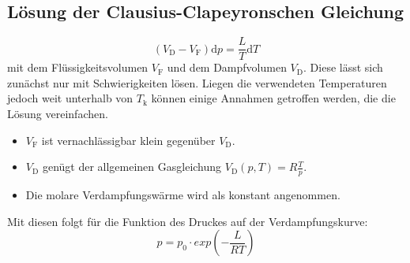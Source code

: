          \subsection{Lösung der Clausius-Clapeyronschen Gleichung}
         \begin{equation}
           (V_\text{D}-V_\text{F})\text{d}p = \frac{L}{T}\text{d}T \label{eq:DGL}
           \end{equation}
           mit dem Flüssigkeitsvolumen $V_\text{F}$ und dem Dampfvolumen $V_\text{D}$.
Diese lässt sich zunächst nur mit Schwierigkeiten lösen.
Liegen die verwendeten Temperaturen jedoch weit unterhalb von $T_\text{k}$ können
 einige Annahmen getroffen werden, die die Lösung vereinfachen.
\begin{itemize}
  \item $V_\text{F}$ ist vernachlässigbar klein gegenüber $V_\text{D}$.
  \item $V_\text{D}$ genügt der allgemeinen Gasgleichung $V_\text{D}(p,T) = R\frac{T}{p}$.
  \item Die molare Verdampfungswärme wird als konstant angenommen.
\end{itemize}
Mit diesen folgt für die Funktion des Druckes auf der Verdampfungskurve:
\begin{equation}
  p = p_0 \cdot exp \left(-\frac{L}{RT}\right) \label{eq:DGLLs}
\end{equation}
